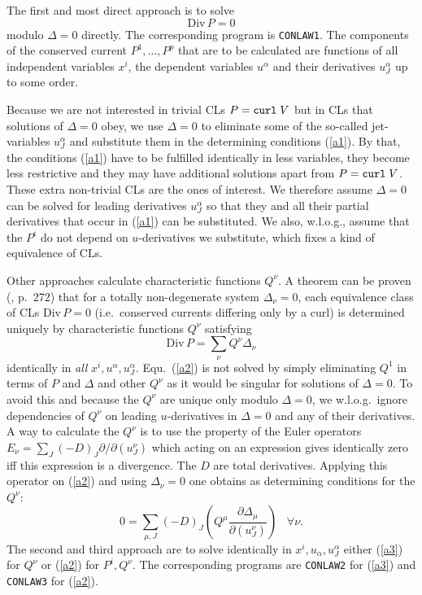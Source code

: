 The first and most direct approach is to solve
\begin{equation}
\mbox{Div}\,P = 0                                     \label{a1}
\end{equation}
modulo $\Delta = 0$ directly. The corresponding program is
{\tt CONLAW1}.
The components of the conserved current $P^1,\ldots,P^p$ that are
to be calculated
are functions of all independent variables $x^i$, the dependent variables
$u^{\alpha}$ and their derivatives $u^{\alpha}_{J}$ up to some order.

Because we are not interested in trivial CLs $P = {\tt curl}\; V$
but in CLs that solutions of $\Delta = 0$ obey,
we use $\Delta = 0$ to eliminate some
of the so-called jet-variables
$u^{\alpha}_{J}$ and substitute them
in the determining conditions (\ref{a1}).
By that, the conditions (\ref{a1}) have to be fulfilled identically
in less variables, they become
less restrictive and they may have additional solutions apart from
$P = {\tt curl}\; V$. These extra non-trivial CLs are the
ones of interest.
We therefore assume $\Delta = 0$ can be solved for
leading derivatives $u^{\alpha}_{J}$ so that they and
all their partial derivatives that occur in (\ref{a1}) can be substituted.
We also, w.l.o.g., assume that the $P^i$ do not depend on
$u$-derivatives we substitute, which fixes a kind of
equivalence of CLs.

Other approaches calculate characteristic functions $Q^{\nu}$.
A theorem can be proven (\cite{PO}, p.\ 272) that for a totally
non-degenerate system $\Delta_{\nu}=0$,
each equivalence class of CLs
$\mbox{Div}\,P = 0$ (i.e.\ conserved currents differing only by a curl)
is determined uniquely by characteristic functions
$Q^{\nu}$ satisfying
\begin{equation}
\mbox{Div}\,P = \sum_{\nu} Q^{\nu} \Delta_{\nu}  \label{a2}
\end{equation}
identically in {\it all} $x^i,u^{\alpha},u^{\alpha}_{J}$.
Equ.\ (\ref{a2}) is not solved by simply eliminating $Q^1$ in terms
of $P$ and $\Delta$ and other $Q^{\nu}$ as it would be singular for
solutions of $\Delta=0$. To avoid this and because the $Q^{\nu}$ are
unique only modulo $\Delta=0$,
we w.l.o.g.\ ignore dependencies of $Q^\nu$ on
leading $u$-derivatives in $\Delta=0$ and any of their derivatives.
A way to calculate the $Q^{\nu}$ is to use the property of the
Euler operators $E_{\nu} = \sum_J (-D)_J \partial/\partial(u^{\nu}_{J})$
which acting
on an expression gives identically zero iff this expression is a divergence.
The $D$ are total derivatives.
Applying this operator on (\ref{a2}) and using $\Delta_{\nu}=0$ one
obtains as determining conditions for the $Q^{\nu}$:
\begin{equation}
0 = \sum_{\mu,J} (-D)_J
   \left( Q^{\mu} \frac{\partial \Delta_{\mu}}
                       {\partial(u^{\nu}_{J})}
   \right) \;\;\; \forall \nu.                           \label{a3}
\end{equation}
The second and third approach are to solve identically in
$x^i,u_{\alpha},u^{\alpha}_{J}$ either
(\ref{a3}) for $Q^{\nu}$ or (\ref{a2}) for $P^i, Q^{\nu}$.
The corresponding programs are
{\tt CONLAW2} for (\ref{a3}) and {\tt CONLAW3} for (\ref{a2}).


